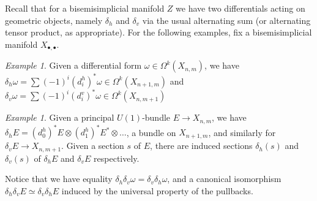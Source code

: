 \documentclass[12pt]{amsart}
\theoremstyle{plain}
\theoremstyle{definition}
\theoremstyle{remark}
\newtheorem{example}[theorem]{Example}
\numberwithin{equation}{section}
\newcommand{\<}{\langle}
\renewcommand{\>}{\rangle}
\begin{document}
Recall that for a bisemisimplicial manifold $Z$ we have two differentials acting on geometric objects, namely $\delta_h$ and $\delta_v$ via the usual alternating sum (or alternating tensor product, as appropriate). 
For the following examples, fix a bisemisimplicial manifold $X_{\bullet,\bullet}$.

\begin{example}
Given a differential form $\omega \in \Omega^k(X_{n,m})$, we have $\delta_h\omega = \sum (-1)^i (d_i^h)^*\omega \in \Omega^k(X_{n+1,m})$ and $\delta_v\omega = \sum (-1)^i (d_i^v)^*\omega \in \Omega^k(X_{n,m+1})$
\end{example}

\begin{example}
Given a principal $U(1)$-bundle $E\to X_{n,m}$, we have $\delta_h E = (d_0^h)^*E\otimes (d_1^h)^*E^* \otimes\ldots$, a bundle on $X_{n+1,m}$, and similarly for $\delta_v E \to X_{n,m+1}$.
Given a section $s$ of $E$, there are induced sections $\delta_h(s)$ and $\delta_v(s)$ of $\delta_h E$ and $\delta_v E$ respectively.
\end{example}

Notice that we have equality $\delta_h\delta_v\omega = \delta_v\delta_h\omega$, and a canonical isomorphism $\delta_h\delta_v E \simeq \delta_v\delta_h E$ induced by the universal property of the pullbacks.
\end{document}
